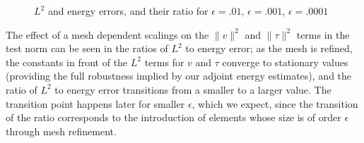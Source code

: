 \begin{figure}[h!]
\centering
{}
\caption{$L^2$ and energy errors, and their ratio for $\epsilon=.01$, $\epsilon=.001$, $\epsilon=.0001$}
\label{ratios_simple}
\end{figure}
The effect of a mesh dependent scalings on the $\|v\|^2$ and $\|\tau\|^2$ terms in the test norm can be seen in the ratios of $L^2$ to energy error; as the mesh is refined, the constants in front of the $L^2$ terms for $v$ and $\tau$ converge to stationary values (providing the full robustness implied by our adjoint energy estimates), and the ratio of $L^2$ to energy error transitions from a smaller to a larger value.  The transition point happens later for smaller $\epsilon$, which we expect, since the transition of the ratio corresponds to the introduction of elements whose size is of order $\epsilon$ through mesh refinement. 

